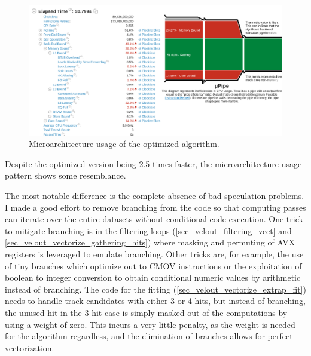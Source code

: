 \documentclass[12pt]{article}
\begin{document}
\begin{figure}[H]
	\begin{center}
		\includegraphics[width=\textwidth]{velout_uarch_overall_opt}
	\end{center}
	\caption{Microarchitecture usage of the optimized algorithm.}
	\label{fig_velout_uarch_overall_opt}
\end{figure}

Despite the optimized version being 2.5 times faster, the microarchitecture usage pattern shows some resemblance.

The most notable difference is the complete absence of bad speculation problems. I made a good effort to remove branching from the code so that computing passes can iterate over the entire datasets without conditional code execution. One trick to mitigate branching is in the filtering loops (\ref{sec_velout_filtering_vect} and \ref{sec_velout_vectorize_gathering_hits}) where masking and permuting of AVX registers is leveraged to emulate branching. Other tricks are, for example, the use of tiny branches which optimize out to CMOV instructions or the exploitation of boolean to integer conversion to obtain conditional numeric values by arithmetic instead of branching. The code for the fitting (\ref{sec_velout_vectorize_extrap_fit}) needs to handle track candidates with either 3 or 4 hits, but instead of branching, the unused hit in the 3-hit case is simply masked out of the computations by using a weight of zero. This incurs a very little penalty, as the weight is needed for the algorithm regardless, and the elimination of branches allows for perfect vectorization.

\vspace{1pc}
\end{document}

